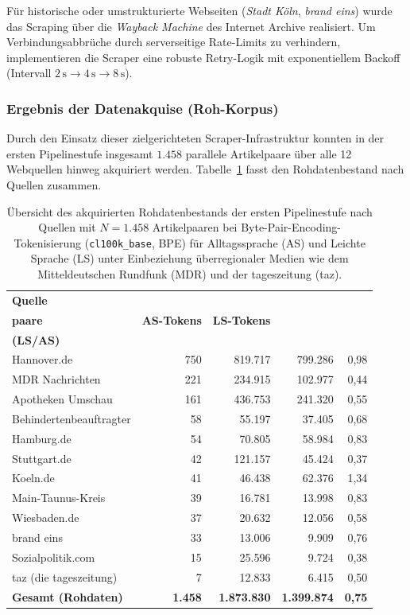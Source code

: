 Für historische oder umstrukturierte Webseiten (\textit{Stadt Köln}, \textit{brand eins}) wurde das Scraping über die \textit{Wayback Machine} des Internet Archive realisiert. Um Verbindungsabbrüche durch serverseitige Rate-Limits zu verhindern, implementieren die Scraper eine robuste Retry-Logik mit exponentiellem Backoff (Intervall $2\,\text{s} \to 4\,\text{s} \to 8\,\text{s}$).

\subsubsection{Ergebnis der Datenakquise (Roh-Korpus)}
Durch den Einsatz dieser zielgerichteten Scraper-Infrastruktur konnten in der ersten Pipelinestufe insgesamt $1.458$ parallele Artikelpaare über alle 12 Webquellen hinweg akquiriert werden. Tabelle~\ref{tab:rohdaten_uebersicht} fasst den Rohdatenbestand nach Quellen zusammen.

\begin{table}[htbp]
\centering
\small
\caption[Übersicht des akquirierten Rohdatenbestands nach Quellen]{Übersicht des akquirierten Rohdatenbestands der ersten Pipelinestufe nach Quellen mit $N = 1.458$ Artikelpaaren bei Byte-Pair-Encoding-Tokenisierung (\texttt{cl100k\_base}, BPE) für Alltagssprache (AS) und Leichte Sprache (LS) unter Einbeziehung überregionaler Medien wie dem Mitteldeutschen Rundfunk (MDR) und der tageszeitung (taz).}
\label{tab:rohdaten_uebersicht}
\begin{tabular}{@{}lrrrr@{}}
\toprule
\textbf{Quelle} & \shortstack[r]{\textbf{Artikel-}\\\textbf{paare}} & \textbf{AS-Tokens} & \textbf{LS-Tokens} & \shortstack[r]{\textbf{Token-Ratio}\\\textbf{(LS/AS)}} \\
\midrule
Hannover.de & 750 & 819.717 & 799.286 & 0,98 \\
MDR Nachrichten & 221 & 234.915 & 102.977 & 0,44 \\
Apotheken Umschau & 161 & 436.753 & 241.320 & 0,55 \\
Behindertenbeauftragter & 58 & 55.197 & 37.405 & 0,68 \\
Hamburg.de & 54 & 70.805 & 58.984 & 0,83 \\
Stuttgart.de & 42 & 121.157 & 45.424 & 0,37 \\
Koeln.de & 41 & 46.438 & 62.376 & 1,34 \\
Main-Taunus-Kreis & 39 & 16.781 & 13.998 & 0,83 \\
Wiesbaden.de & 37 & 20.632 & 12.056 & 0,58 \\
brand eins & 33 & 13.006 & 9.909 & 0,76 \\
Sozialpolitik.com & 15 & 25.596 & 9.724 & 0,38 \\
taz (die tageszeitung) & 7 & 12.833 & 6.415 & 0,50 \\
\midrule
\textbf{Gesamt (Rohdaten)} & \textbf{1.458} & \textbf{1.873.830} & \textbf{1.399.874} & \textbf{0,75} \\
\bottomrule
\end{tabular}
\end{table}

